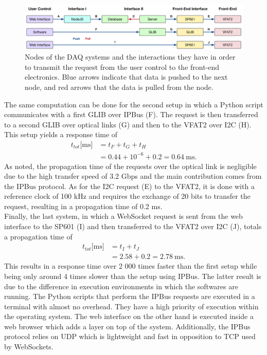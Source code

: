       \begin{figure}[t!]
        \centering
        \includegraphics[width=\textwidth]{img/III-2-web-daq/ctrl_req}
        \caption{Nodes of the DAQ systems and the interactions they have in order to transmit the request from the user control to the front-end electronics. Blue arrows indicate that data is pushed to the next node, and red arrows that the data is pulled from the node.}
        \label{fig:III-2-ctrl-req}
      \end{figure}

      The same computation can be done for the second setup in which a Python script communicates with a first GLIB over IPBus (F). The request is then transferred to a second GLIB over optical links (G) and then to the VFAT2 over I2C (H). This setup yields a response time of
      \begin{equation}
        \begin{split}
          t_{tot}\text{[ms]} & = t_F + t_G + t_H \\
                             & = 0.44 + 10^{-6} + 0.2 = 0.64 \ \text{ms}.
        \end{split}
      \end{equation}
      As noted, the propagation time of the requests over the optical link is negligible due to the high transfer speed of 3.2 Gbps and the main contribution comes from the IPBus protocol. As for the I2C request (E) to the VFAT2, it is done with a reference clock of 100 kHz and requires the exchange of 20 bits to transfer the request, resulting in a propagation time of 0.2 ms. \\

      Finally, the last system, in which a WebSocket request is sent from the web interface to the SP601 (I) and then transferred to the VFAT2 over I2C (J), totals a propagation time of
      \begin{equation}
        \begin{split}
          t_{tot}\text{[ms]} & = t_I + t_J \\
                             & = 2.58 + 0.2 = 2.78 \ \text{ms}.
        \end{split}
      \end{equation}
      This results in a response time over 2 000 times faster than the first setup while being only around 4 times slower than the setup using IPBus. The latter result is due to the difference in execution environments in which the softwares are running. The Python scripts that perform the IPBus requests are executed in a terminal with almost no overhead. They have a high priority of execution within the operating system. The web interface on the other hand is executed inside a web browser which adds a layer on top of the system. Additionally, the IPBus protocol relies on UDP which is lightweight and fast in opposition to TCP used by WebSockets. \\

